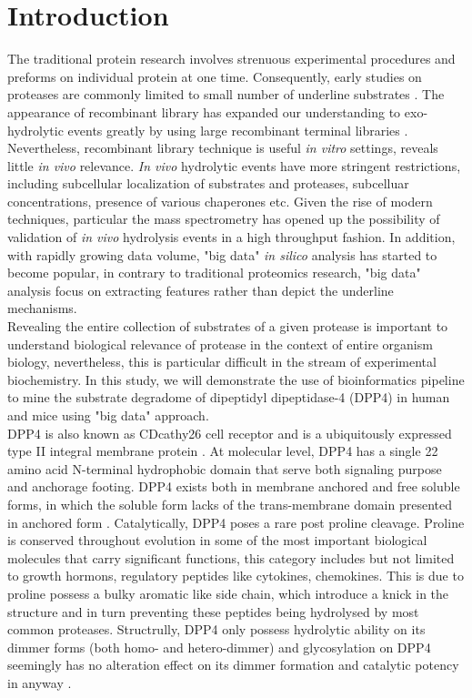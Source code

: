 \section{Introduction}

The traditional protein research involves strenuous experimental procedures and preforms on individual protein at one time. Consequently, early studies on proteases are commonly limited to small number of underline substrates \cite{:1992aa}. The appearance of recombinant library has expanded our understanding to exo-hydrolytic events greatly by using large recombinant terminal libraries \cite{Gupta:2010aa}. Nevertheless, recombinant library technique is useful \textit{in vitro} settings, reveals little \textit{in vivo} relevance. \textit{In vivo} hydrolytic events have more stringent restrictions, including subcellular localization of substrates and proteases, subcelluar concentrations, presence of various chaperones etc. Given the rise of modern techniques, particular the mass spectrometry has opened up the possibility of validation of \textit{in vivo} hydrolysis events in a high throughput fashion. In addition, with rapidly growing data volume, "big data" \textit{in silico} analysis has started to become popular, in contrary to traditional proteomics research, "big data" analysis focus on extracting features rather than depict the underline mechanisms. 
\\
Revealing the entire collection of substrates of a given protease is important to understand biological relevance of protease in the context of entire organism biology, nevertheless, this is particular difficult in the stream of experimental biochemistry. In this study, we will demonstrate the use of bioinformatics pipeline to mine the substrate degradome of dipeptidyl dipeptidase-4 (DPP4) in human and mice using "big data" approach. 
\\
DPP4 is also known as CDcathy\cite{Abbott:2000qr}26 cell receptor and is a ubiquitously expressed type II integral membrane protein \cite{Mentlein_1999}. At molecular level, DPP4 has a single 22 amino acid N-terminal hydrophobic domain that serve both signaling purpose and anchorage footing. \cite{Mentlein_1999, Abbott_2002} DPP4 exists both in membrane anchored and free soluble forms, in which the soluble form lacks of the trans-membrane domain presented in anchored form \cite{Lambeir:2001ab,Abbott:2000qr}. Catalytically, DPP4 poses a rare post proline cleavage. Proline is conserved throughout evolution in some of the most important biological molecules that carry significant functions, this category includes but not limited to growth hormons, regulatory peptides like cytokines, chemokines. This is due to proline possess a bulky aromatic like side chain, which introduce a knick in the structure and in turn preventing these peptides being hydrolysed by most common proteases. Structrully, DPP4 only possess hydrolytic ability on its dimmer forms (both homo- and hetero-dimmer) and glycosylation on DPP4 seemingly has no alteration effect on its dimmer formation and catalytic potency in anyway \cite{Aertgeerts:2004aa}. 
